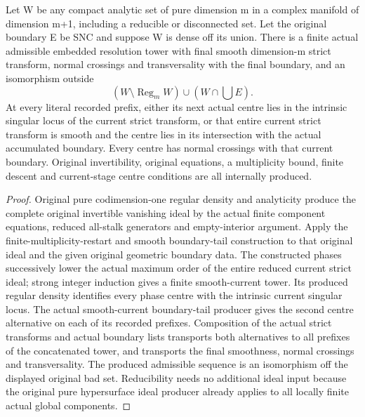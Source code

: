 \begin{theorem}
\label{hir:natural-pure-hypersurface-embedded-stage-centres}
\leanok
{}
Let W be any compact analytic set of pure dimension m in a complex
manifold of dimension m+1, including a reducible or disconnected set.
Let the original boundary E be SNC and suppose W is dense off its
union. There is a finite actual admissible embedded resolution tower
with final smooth dimension-m strict transform, normal crossings and
transversality with the final boundary, and an isomorphism outside
\[
 (W\setminus\operatorname{Reg}_m W)\cup(W\cap\bigcup E).
\]
At every literal recorded prefix, either its next actual centre lies
in the intrinsic singular locus of the current strict transform, or
that entire current strict transform is smooth and the centre lies
in its intersection with the actual accumulated boundary. Every
centre has normal crossings with that current boundary. Original
invertibility, original equations, a multiplicity bound, finite descent
and current-stage centre conditions are all internally produced.
\end{theorem}
\begin{proof}
Original pure codimension-one regular density and analyticity produce
the complete original invertible vanishing ideal by the actual finite
component equations, reduced all-stalk generators and empty-interior
argument. Apply the finite-multiplicity-restart and smooth boundary-tail
construction to that original ideal and the given original geometric
boundary data. The constructed phases successively lower the actual
maximum order of the entire reduced current strict ideal; strong integer
induction gives a finite smooth-current tower. Its produced regular
density identifies every phase centre with the intrinsic current
singular locus. The actual smooth-current boundary-tail producer gives
the second centre alternative on each of its recorded prefixes.
Composition of the actual strict transforms and actual boundary lists
transports both alternatives to all prefixes of the concatenated tower,
and transports the final smoothness, normal crossings and transversality.
The produced admissible sequence is an isomorphism off the displayed
original bad set. Reducibility needs no additional ideal input because
the original pure hypersurface ideal producer already applies to all
locally finite actual global components.
\end{proof}
